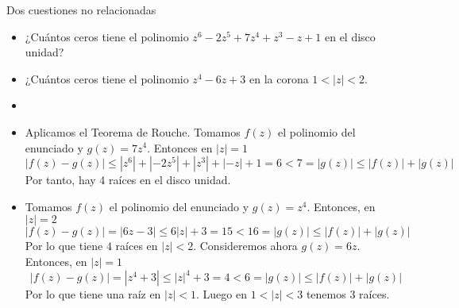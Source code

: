 \documentclass[twoside]{article}
\begin{document}
\begin{ejercicio}{2}
Dos cuestiones no relacionadas
\begin{itemize}
\item ¿Cuántos ceros tiene el polinomio $z^6-2z^5 +7z^4+z^3-z+1$ en el disco unidad?
\item ¿Cuántos ceros tiene el polinomio $z^4-6z+3$ en la corona $1<|z|<2$.
\end{itemize}
\end{ejercicio}
\begin{solucion}
\begin{itemize}
\item[]
\item Aplicamos el Teorema de Rouche. Tomamos $f(z)$ el polinomio del enunciado y $g(z)=7z^4$. Entonces en $|z|=1$
$$
|f(z)-g(z)| \leq  |z^6| + |-2z^5| + |z^3| + |-z| +1 = 6 < 7 = |g(z)| \leq |f(z)|+|g(z)|
$$
Por tanto, hay 4 raíces en el disco unidad.
\item Tomamos $f(z)$ el polinomio del enunciado y $g(z)=z^4$. Entonces, en $|z|=2$
$$
|f(z)-g(z)| = |6z-3| \leq 6|z|+3 = 15 < 16 = |g(z)| \leq |f(z)|+ |g(z)|
$$
Por lo que tiene $4$ raíces en $|z|<2$. Consideremos ahora $g(z)=6z$. Entonces, en $|z|=1$
$$
|f(z)-g(z)| = |z^4+3|\leq |z|^4+3 = 4 < 6 = |g(z)| \leq |f(z)|+|g(z)|
$$
Por lo que tiene una raíz en $|z|<1$. Luego en $1<|z|<3$ tenemos $3$ raíces.
\end{itemize}
\end{solucion}
\newpage
\end{document}
